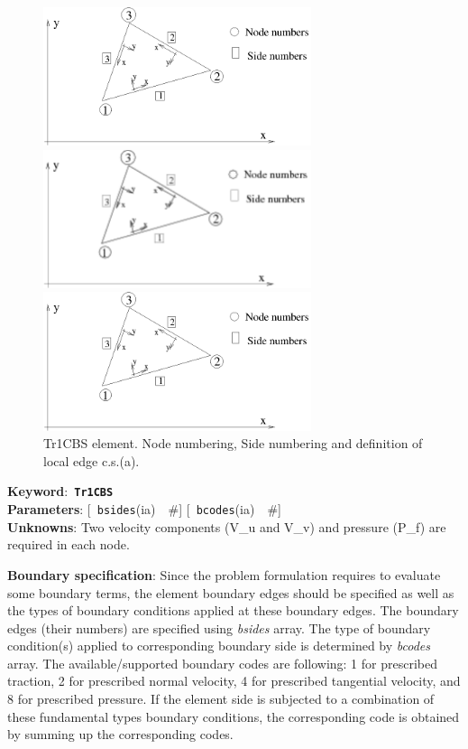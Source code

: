 \documentclass[a4paper]{article}
\newcommand{\descitem}[1]{{\noindent \bf #1}:}
\newcommand{\elemkeyword}[1]{\descitem{Keyword}~{\bf \texttt{#1}}}
\newcommand{\elemparam}[2]{{{\texttt{#1}\tiny (#2)}~~\#}}
\newcommand{\optelemparam}[2]{{[~\elemparam{#1}{#2}]}}
\newcommand{\param}[1]{{\em #1}}
\begin{document}
\begin{figure}[tb]
\begin{htmlonly}
  \centerline{\includegraphics[width=0.7\textwidth]{trplanstrss.eps}}
\end{htmlonly}
\ifpdf
 \centerline{\includegraphics[width=0.7\textwidth]{trplanstrss.pdf}}
\else
 \centerline{\includegraphics[width=0.7\textwidth]{trplanstrss.eps}}
\fi
\caption{Tr1CBS element. Node numbering, Side numbering and
definition of local edge c.s.(a).}
\label{Tr1CBSfig}
\end{figure}

\elemkeyword{Tr1CBS}\\
\descitem{Parameters} \optelemparam{bsides}{ia} \optelemparam{bcodes}{ia}\\
\descitem{Unknowns}
Two velocity components (V\_u and V\_v) and pressure (P\_f) are required in each node.

\descitem{Boundary specification}
Since the problem formulation requires to evaluate some boundary terms,
the element boundary edges should be specified as well as the types of
boundary conditions applied at these boundary edges. The boundary
edges (their numbers) are specified using \param{bsides} array. The
type of boundary condition(s) applied to corresponding boundary side
is determined by \param{bcodes} array. The available/supported
boundary codes are following: 1 for prescribed traction, 2 for
prescribed normal velocity, 4 for prescribed tangential velocity, and
8 for prescribed pressure. If the element side is subjected to a
combination of these fundamental types boundary conditions, the
corresponding code is obtained by summing up the corresponding codes.
\end{document}
